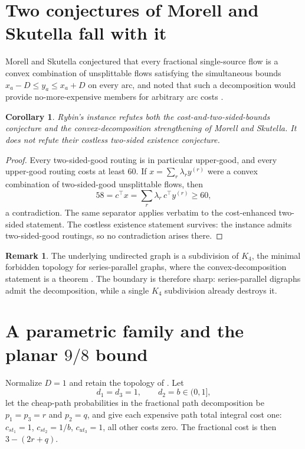 \documentclass[11pt]{article}
\newtheorem{corollary}[theorem]{Corollary}
\theoremstyle{definition}
\newtheorem{remark}[theorem]{Remark}
\begin{document}
\section{Two conjectures of Morell and Skutella fall with it}\label{sec:corollaries}

Morell and Skutella conjectured that every fractional single-source flow is a
convex combination of unsplittable flows satisfying the simultaneous bounds
$x_a-D\le y_a\le x_a+D$ on every arc, and noted that such a decomposition
would provide no-more-expensive members for arbitrary arc costs
\cite[Conjecture~2]{MorellSkutella2022}.

\begin{corollary}\label{cor:convex}
Rybin's instance refutes both the cost-and-two-sided-bounds conjecture and
the convex-decomposition strengthening of Morell and Skutella.  It does not
refute their costless two-sided existence conjecture.
\end{corollary}
\begin{proof}
Every two-sided-good routing is in particular upper-good, and every
upper-good routing costs at least $60$.  If $x=\sum_r\lambda_r y^{(r)}$ were
a convex combination of two-sided-good unsplittable flows, then
\[
 58=c^\top x=\sum_r\lambda_r\,c^\top y^{(r)}\ge 60,
\]
a contradiction.  The same separator applies verbatim to the cost-enhanced
two-sided statement.  The costless existence statement survives: the instance
admits two-sided-good routings, so no contradiction arises there.
\end{proof}

\begin{remark}
The underlying undirected graph is a subdivision of $K_4$, the minimal
forbidden topology for series-parallel graphs, where the convex-decomposition
statement is a theorem \cite{AlmoghrabiSkutellaWarode2026}.  The boundary is
therefore sharp: series-parallel digraphs admit the decomposition, while a
single $K_4$ subdivision already destroys it.
\end{remark}

\section{A parametric family and the planar $9/8$ bound}\label{sec:family}

Normalize $D=1$ and retain the topology of .  Let
\[
 d_1=d_3=1,\qquad d_2=b\in(0,1],
\]
let the cheap-path probabilities in the fractional path decomposition be
$p_1=p_3=r$ and $p_2=q$, and give each expensive path total integral cost
one: $c_{st_1}=1$, $c_{st_2}=1/b$, $c_{ut_3}=1$, all other costs zero.  The
fractional cost is then $3-(2r+q)$.
\end{document}
